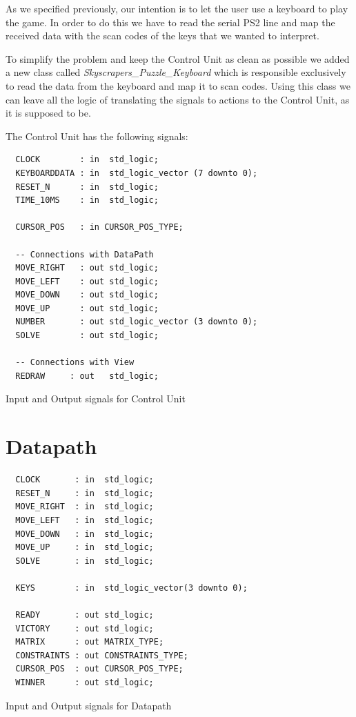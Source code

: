 \documentclass[12pt]{report}
\begin{document}
As we specified previously, our intention is to let the user use
a keyboard to play the game. In order to do this we have to read the
serial PS2 line and map the received data with the scan codes of the
keys that we wanted to interpret.

To simplify the problem and keep the Control Unit as clean as possible
we added a new class called \textit{Skyscrapers\_Puzzle\_Keyboard} which is
responsible exclusively to read the data from the keyboard and map it to
scan codes. Using this class we can leave all the logic of translating
the signals to actions to the Control Unit, as it is supposed to be.

The Control Unit has the following signals:

\begin{center}
\begin{minipage}{0.5\textwidth}
\begin{verbatim}
  CLOCK        : in  std_logic;
  KEYBOARDDATA : in  std_logic_vector (7 downto 0);
  RESET_N      : in  std_logic;
  TIME_10MS    : in  std_logic;

  CURSOR_POS   : in CURSOR_POS_TYPE;

  -- Connections with DataPath
  MOVE_RIGHT   : out std_logic;
  MOVE_LEFT    : out std_logic;
  MOVE_DOWN    : out std_logic;
  MOVE_UP      : out std_logic;
  NUMBER       : out std_logic_vector (3 downto 0);
  SOLVE        : out std_logic;

  -- Connections with View
  REDRAW     : out   std_logic;
\end{verbatim}
\caption{Input and Output signals for Control Unit}
\end{minipage}
\end{center}

\newpage

\section*{Datapath}

\begin{center}
\begin{minipage}{0.5\textwidth}
\begin{verbatim}
  CLOCK       : in  std_logic;
  RESET_N     : in  std_logic;
  MOVE_RIGHT  : in  std_logic;
  MOVE_LEFT   : in  std_logic;
  MOVE_DOWN   : in  std_logic;
  MOVE_UP     : in  std_logic;
  SOLVE       : in  std_logic;

  KEYS        : in  std_logic_vector(3 downto 0);

  READY       : out std_logic;
  VICTORY     : out std_logic;
  MATRIX      : out MATRIX_TYPE;
  CONSTRAINTS : out CONSTRAINTS_TYPE;
  CURSOR_POS  : out CURSOR_POS_TYPE;
  WINNER      : out std_logic;
\end{verbatim}
\caption{Input and Output signals for Datapath}
\end{minipage}
\end{center}
\end{document}

